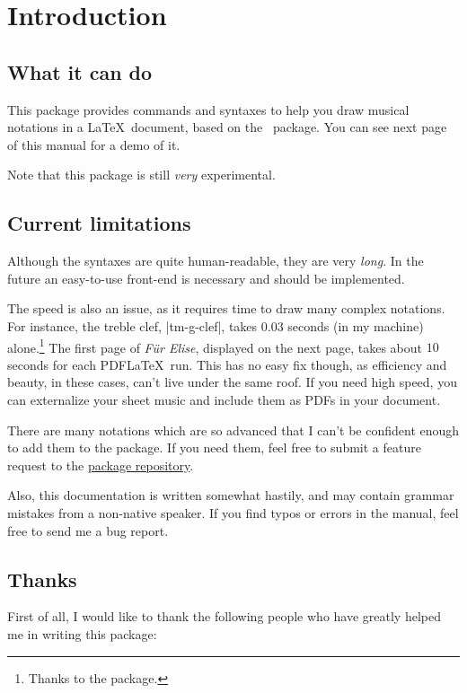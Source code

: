 \section{Introduction}\label{sec:intro}
\subsection{What it can do}\label{sec:intro:intro}
This package provides commands and syntaxes to help you draw musical notations in 
a \LaTeX\ document, based on the \tikzname\ package. You can see next page of 
this manual for a demo of it.

Note that this package is still \emph{very} experimental.
\subsection{Current limitations}\label{sec:intro:limitations}
Although the syntaxes are quite human-readable, they are very \emph{long}. In 
the future an easy-to-use front-end is necessary and should be implemented.

The speed is also an issue, as it requires time to draw many complex notations. 
For instance, the treble clef, |tm-g-clef|, takes $0.03$ seconds (in my machine) 
alone.\footnote{Thanks to the  package.} The first page of 
\emph{F\"ur Elise}, displayed on the next page, takes about $10$ seconds for each 
PDF\LaTeX\ run. This has no easy fix though, as efficiency and beauty, in these 
cases, can't live under the same roof. If you need high speed, you can 
externalize your sheet music and include them as PDFs in your document.

There are many notations which are so advanced that I can't be confident enough 
to add them to the package. If you need them, feel free to submit a feature 
request to the \href{https://github.com/joulev/tikzmusic}{package repository}. 

Also, this documentation is written somewhat hastily, and may contain grammar 
mistakes from a non-native speaker. If you find typos or errors in the manual, 
feel free to send me a bug report.
\subsection{Thanks}\label{sec:intro:thanks}
First of all, I would like to thank the following people who have greatly 
helped me in writing this package:


